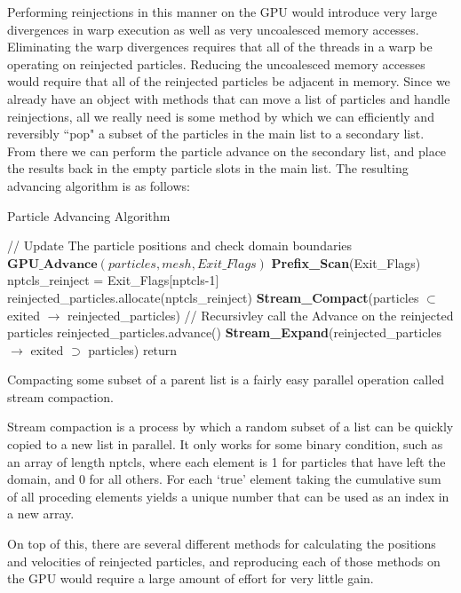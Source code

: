 Performing reinjections in this manner on the GPU would introduce very large divergences in warp execution as well as very uncoalesced memory accesses. Eliminating the warp divergences requires that all of the threads in a warp be operating on reinjected particles. Reducing the uncoalesced memory accesses would require that all of the reinjected particles be adjacent in memory. Since we already have an object with methods that can move a list of particles and handle reinjections, all we really need is some method by which we can efficiently and reversibly ``pop" a subset of the particles in the main list to a secondary list. From there we can perform the particle advance on the secondary list, and place the results back in the empty particle slots in the main list. The resulting advancing algorithm is as follows:

\begin{algorithm}
	\caption{Particle Advancing Algorithm}
	\label{alg:advancing}
	\begin{algorithmic}
		\STATE // Update The particle positions and check domain boundaries
		\STATE $\textbf{GPU\_Advance}(particles,mesh,Exit\_Flags)$
		\STATE
		\STATE \textbf{Prefix\_Scan}(Exit\_Flags)
		\STATE
		\STATE nptcls\_reinject = Exit\_Flags[nptcls-1]
		\STATE
			\STATE
			\STATE reinjected\_particles.allocate(nptcls\_reinject)
			\STATE
			\STATE \textbf{Stream\_Compact}(particles $\subset$ exited $\rightarrow$ reinjected\_particles)
			\STATE
			\STATE // Recursivley call the Advance on the reinjected particles
			\STATE reinjected\_particles.advance()
			\STATE
			\STATE \textbf{Stream\_Expand}(reinjected\_particles $\rightarrow$ exited $\supset$ particles)
		\ENDIF
		\STATE
		\STATE return
	\end{algorithmic}
\end{algorithm}

Compacting some subset of a parent list is a fairly easy parallel operation called stream compaction. 

Stream compaction is a process by which a random subset of a list can be quickly copied to a new list in parallel. It only works for some binary condition, such as an array of length nptcls, where each element is 1 for particles that have left the domain, and 0 for all others. For each `true' element taking the cumulative sum of all proceding elements yields a unique number that can be used as an index in a new array. 

On top of this, there are several different methods for calculating the positions and velocities of reinjected particles, and reproducing each of those methods on the GPU would require a large amount of effort for very little gain. 






